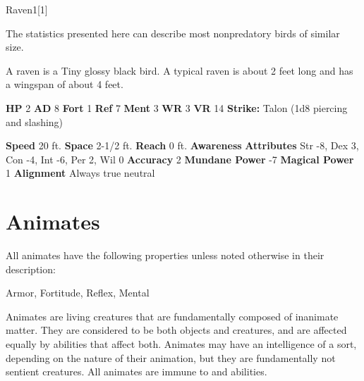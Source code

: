   
  \begin{monsection}{Raven}{1}[1]
    \vspace{-1em}\vspace{-1em}
    \vspace{0em}

    
      The statistics presented here can describe most nonpredatory birds of similar size.
    
        A raven is a Tiny glossy black bird.
        A typical raven is about 2 feet long and has a wingspan of about 4 feet.
      

    \begin{spellcontent}
      \begin{spelltargetinginfo}
        \pari \textbf{HP} 2 \monsep
          \textbf{AD} 8 \monsep
          \textbf{Fort} 1 \monsep
          \textbf{Ref} 7 \monsep
          \textbf{Ment} 3
        \pari \textbf{WR} 3 \monsep
        \textbf{VR} 14
        \pari \textbf{Strike:}
            Talon  (1d8 piercing and slashing)
      \end{spelltargetinginfo}
    \end{spellcontent}
    \begin{monsterfooter}
      \pari \textbf{Speed} 20 ft. \monsep
        \textbf{Space} 2-1/2 ft. \monsep
        \textbf{Reach} 0 ft.
      \pari \textbf{Awareness} 
      \pari \textbf{Attributes}
        Str -8, Dex 3,
        Con -4, Int -6,
        Per 2, Wil 0
      \pari \textbf{Accuracy} 2 \monsep
        \textbf{Mundane Power} -7 \monsep
      \textbf{Magical Power} 1
      \pari \textbf{Alignment} Always true neutral
    \end{monsterfooter}
  \end{monsection}
  
  
        \newpage
        \section{Animates}

        All animates have the following properties unless noted otherwise in their description:
        
    
     Armor,
     Fortitude,
     Reflex,
     Mental
  
     Animates are living creatures that are fundamentally composed of inanimate matter.
    They are considered to be both objects and creatures, and are affected equally by abilities that affect both.
     Animates may have an intelligence of a sort, depending on the nature of their animation, but they are fundamentally not sentient creatures.
    All animates are immune to  and  abilities.
  
